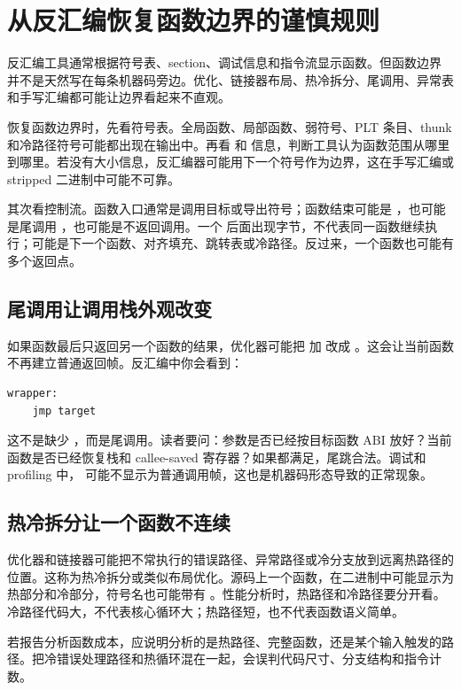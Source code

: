 \section{从反汇编恢复函数边界的谨慎规则}

反汇编工具通常根据符号表、section、调试信息和指令流显示函数。但函数边界并不是天然写在每条机器码旁边。优化、链接器布局、热冷拆分、尾调用、异常表和手写汇编都可能让边界看起来不直观。

恢复函数边界时，先看符号表。全局函数、局部函数、弱符号、PLT 条目、thunk 和冷路径符号可能都出现在输出中。再看  和  信息，判断工具认为函数范围从哪里到哪里。若没有大小信息，反汇编器可能用下一个符号作为边界，这在手写汇编或 stripped 二进制中可能不可靠。

其次看控制流。函数入口通常是调用目标或导出符号；函数结束可能是 ，也可能是尾调用 ，也可能是不返回调用。一个  后面出现字节，不代表同一函数继续执行；可能是下一个函数、对齐填充、跳转表或冷路径。反过来，一个函数也可能有多个返回点。

\subsection{尾调用让调用栈外观改变}

如果函数最后只返回另一个函数的结果，优化器可能把  加  改成 。这会让当前函数不再建立普通返回帧。反汇编中你会看到：

\begin{lstlisting}
wrapper:
    jmp target
\end{lstlisting}

这不是缺少 ，而是尾调用。读者要问：参数是否已经按目标函数 ABI 放好？当前函数是否已经恢复栈和 callee-saved 寄存器？如果都满足，尾跳合法。调试和 profiling 中， 可能不显示为普通调用帧，这也是机器码形态导致的正常现象。

\subsection{热冷拆分让一个函数不连续}

优化器和链接器可能把不常执行的错误路径、异常路径或冷分支放到远离热路径的位置。这称为热冷拆分或类似布局优化。源码上一个函数，在二进制中可能显示为热部分和冷部分，符号名也可能带有 。性能分析时，热路径和冷路径要分开看。冷路径代码大，不代表核心循环大；热路径短，也不代表函数语义简单。

若报告分析函数成本，应说明分析的是热路径、完整函数，还是某个输入触发的路径。把冷错误处理路径和热循环混在一起，会误判代码尺寸、分支结构和指令计数。

